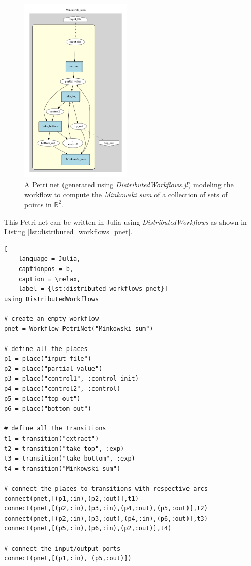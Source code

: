 \documentclass{juliacon}
\begin{document}
\begin{figure}[h]
    \centerline{\includegraphics[height=9cm, keepaspectratio]{Minkowski_sum.png}}
    \caption{A Petri net (generated using \emph{DistributedWorkflows.jl}) modeling the workflow to compute the \emph{Minkowski sum} of a collection of sets of points in $\mathbb{R}^2$.}
    \label{patrinet_example_how_to_use}
\end{figure}

This Petri net can be written in Julia using \emph{DistributedWorkflows} as shown in Listing \ref{lst:distributed_workflows_pnet}.

\begin{lstlisting}[
    language = Julia,
    captionpos = b,
    caption = \relax,
    label = {lst:distributed_workflows_pnet}]
using DistributedWorkflows

# create an empty workflow
pnet = Workflow_PetriNet("Minkowski_sum")

# define all the places
p1 = place("input_file")
p2 = place("partial_value")
p3 = place("control1", :control_init)
p4 = place("control2", :control)
p5 = place("top_out")
p6 = place("bottom_out")

# define all the transitions
t1 = transition("extract")
t2 = transition("take_top", :exp)
t3 = transition("take_bottom", :exp)
t4 = transition("Minkowski_sum")

# connect the places to transitions with respective arcs
connect(pnet,[(p1,:in),(p2,:out)],t1)
connect(pnet,[(p2,:in),(p3,:in),(p4,:out),(p5,:out)],t2)
connect(pnet,[(p2,:in),(p3,:out),(p4,:in),(p6,:out)],t3)
connect(pnet,[(p5,:in),(p6,:in),(p2,:out)],t4)

# connect the input/output ports
connect(pnet,[(p1,:in), (p5,:out)])
\end{lstlisting}
\end{document}
